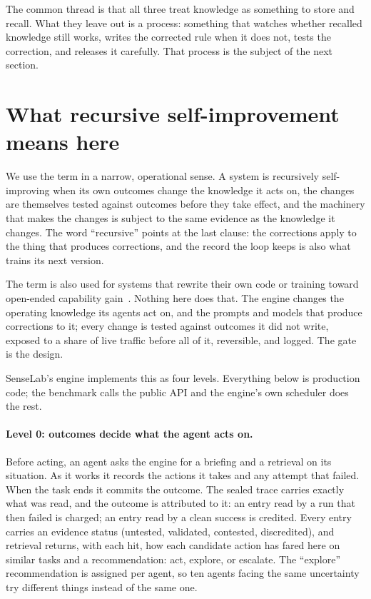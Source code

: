 \documentclass[11pt]{article}
\begin{document}
The common thread is that all three treat knowledge as something to store and recall. What they
leave out is a process: something that watches whether recalled knowledge still works, writes
the corrected rule when it does not, tests the correction, and releases it carefully. That
process is the subject of the next section.

\section{What recursive self-improvement means here}
\label{sec:rsi}

We use the term in a narrow, operational sense. A system is recursively self-improving when its
own outcomes change the knowledge it acts on, the changes are themselves tested against outcomes
before they take effect, and the machinery that makes the changes is subject to the same
evidence as the knowledge it changes. The word ``recursive'' points at the last clause: the
corrections apply to the thing that produces corrections, and the record the loop keeps is also
what trains its next version.

The term is also used for systems that rewrite their own code or training toward open-ended
capability gain~\cite{godel,dgm}. Nothing here does that. The engine changes the operating
knowledge its agents act on, and the prompts and models that produce corrections to it; every
change is tested against outcomes it did not write, exposed to a share of live traffic before
all of it, reversible, and logged. The gate is the design.

SenseLab's engine implements this as four levels. Everything below is production code; the
benchmark calls the public API and the engine's own scheduler does the rest.

\paragraph{Level 0: outcomes decide what the agent acts on.} Before acting, an agent asks the
engine for a briefing and a retrieval on its situation. As it works it records the actions it
takes and any attempt that failed. When the task ends it commits the outcome. The sealed trace
carries exactly what was read, and the outcome is attributed to it: an entry read by a run that
then failed is charged; an entry read by a clean success is credited. Every entry carries an
evidence status (untested, validated, contested, discredited), and retrieval returns, with each
hit, how each candidate action has fared here on similar tasks and a recommendation: act,
explore, or escalate. The ``explore'' recommendation is assigned per agent, so ten agents facing
the same uncertainty try different things instead of the same one.
\end{document}

